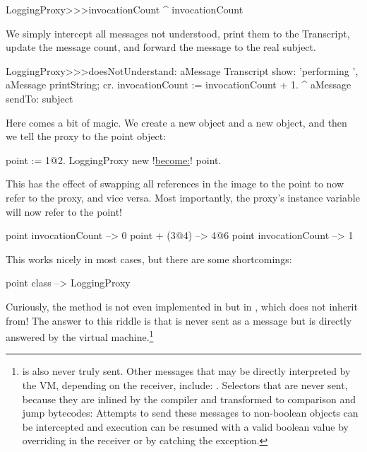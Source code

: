 \documentclass[a4paper,10pt,twoside]{book}
\begin{document}
\begin{code}{}
LoggingProxy>>>invocationCount
	^ invocationCount
\end{code}

We simply intercept all messages not understood, print them to the Transcript, update the message count, and forward the message to the real subject.
\begin{code}{}
LoggingProxy>>>doesNotUnderstand: aMessage 
	Transcript show: 'performing ', aMessage printString; cr.
	invocationCount := invocationCount + 1.
	^ aMessage sendTo: subject
\end{code}

Here comes a bit of magic.
We create a new  object and a new  object, and then we tell the proxy to  the point object:
\begin{code}{}
point := 1@2.
LoggingProxy new !\underline{become:}! point.
\end{code}

This has the effect of swapping all references in the image to the point to now refer to the proxy, and vice versa. Most importantly, the proxy's  instance variable will now refer to the point!

\begin{code}{}
point invocationCount --> 0
point + (3@4)             --> 4@6
point invocationCount --> 1
\end{code}

This works nicely in most cases, but there are some shortcomings:
\begin{code}{}
point class --> LoggingProxy
\end{code}
Curiously, the method  is not even implemented in  but in , which  does not inherit from!
The answer to this riddle is that  is never sent as a message but is directly answered by the virtual machine.\footnote{ is also never truly sent.
Other messages that may be directly interpreted by the VM, depending on the receiver, include:
\ct{+- < > <= >= = ~= * / \ ==}
.
Selectors that are never sent, because they are inlined by the compiler and transformed to comparison and jump bytecodes:
Attempts to send these messages to non-boolean objects can be intercepted and execution can be resumed with a valid boolean value by overriding  in the receiver or by catching the  exception.
}%
\end{document}
